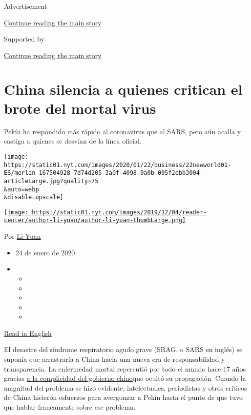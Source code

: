 Advertisement

\protect\hyperlink{after-top}{Continue reading the main story}

Supported by

\protect\hyperlink{after-sponsor}{Continue reading the main story}

\hypertarget{china-silencia-a-quienes-critican-el-brote-del-mortal-virus}{%
\section{China silencia a quienes critican el brote del mortal
virus}\label{china-silencia-a-quienes-critican-el-brote-del-mortal-virus}}

Pekín ha respondido más rápido al coronavirus que al SARS, pero aún
acalla y castiga a quienes se desvían de la línea oficial.

\texttt{[image: https://static01.nyt.com/images/2020/01/22/business/22newworld01-ES/merlin\_167504928\_7d74d205-3a0f-4098-9a0b-005f2ebb3004-articleLarge.jpg?quality=75\\\&auto=webp\\\&disable=upscale]}

\href{https://www.nytimes.com/by/li-yuan}{\texttt{[image: https://static01.nyt.com/images/2019/12/04/reader-center/author-li-yuan/author-li-yuan-thumbLarge.png]}}

Por \href{https://www.nytimes.com/by/li-yuan}{Li Yuan}

\begin{itemize}
\item
  24 de enero de 2020
\item
  \begin{itemize}
  \item
  \item
  \item
  \item
  \item
  \end{itemize}
\end{itemize}

\href{https://www.nytimes.com/2020/01/22/health/virus-corona.html}{Read
in English}

El desastre del síndrome respiratorio agudo grave (SRAG, o SARS en
inglés) se suponía que arrastraría a China hacia una nueva era de
responsabilidad y transparencia. La enfermedad mortal repercutió por
todo el mundo hace 17 años gracias
\href{https://www.nytimes.com/2003/04/13/weekinreview/china-discovers-secrecy-is-expensive.html}{a
la complicidad del gobierno chino}que ocultó su propagación. Cuando la
magnitud del problema se hizo evidente, intelectuales, periodistas y
otros críticos de China hicieron esfuerzos para avergonzar a Pekín hasta
el punto de que tuvo que hablar francamente sobre ese problema.

